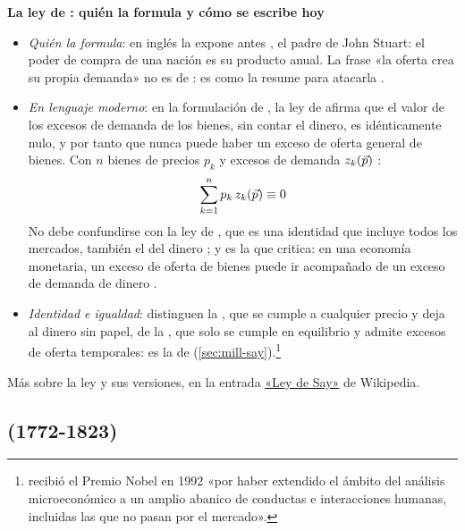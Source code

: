 \documentclass[11pt]{article}
\begin{document}
\begin{anotaciones}
\textbf{La ley de : quién la formula y cómo se escribe hoy}
\begin{itemize}
\item \emph{Quién la formula}: en inglés la expone antes \textcite{MillJames1808Commerce}, el padre de John Stuart: el poder de compra de una nación es su producto anual. La frase «la oferta crea su propia demanda» no es de : es como la resume \textcite[cap.~2]{Keynes1936} para atacarla .
\item \emph{En lenguaje moderno}: en la formulación de \textcite{Lange1942Say}, la ley de  afirma que el valor de los excesos de demanda de los bienes, sin contar el dinero, es idénticamente nulo, y por tanto que nunca puede haber un exceso de oferta general de bienes. Con $n$ bienes de precios $p_k$ y excesos de demanda $z_k(\vec{p})$ :
  \begin{equation}\label{eq:say}
  \sum_{k=1}^{n}p_k\,z_k(\vec{p})\equiv 0
  \end{equation}
  No debe confundirse con la ley de , que es una identidad que incluye todos los mercados, también el del dinero ; y es la que  critica: en una economía monetaria, un exceso de oferta de bienes puede ir acompañado de un exceso de demanda de dinero .
\item \emph{Identidad e igualdad}: \textcite{BeckerBaumol1952Classical} distinguen la , que se cumple a cualquier precio y deja al dinero sin papel, de la , que solo se cumple en equilibrio y admite excesos de oferta temporales: es la de  (\ref{sec:mill-say}).\footnote{ recibió el Premio Nobel en 1992 «por haber extendido el ámbito del análisis microeconómico a un amplio abanico de conductas e interacciones humanas, incluidas las que no pasan por el mercado»\nocite{Nobel1992Becker}.}
\end{itemize}
Más sobre la ley y sus versiones, en la entrada \href{https://es.wikipedia.org/wiki/Ley_de_Say}{«Ley de Say»} de Wikipedia.
\end{anotaciones}

\subsection{ (1772-1823)}\label{sec:ricardo}
\end{document}
